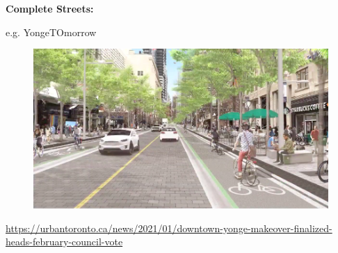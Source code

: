 \documentclass[aspectratio=169]{beamer}
\begin{document}
\begin{frame}
	
	\textbf{Complete Streets:} 
	
	\vspace{2mm}
	
	e.g. YongeTOmorrow 
	
	\vspace{2mm}
	
	\begin{figure}
		\centering
		\includegraphics[width=0.85\linewidth]{images/yongetomorrow.png}
	\end{figure}
	
	\tiny\url{https://urbantoronto.ca/news/2021/01/downtown-yonge-makeover-finalized-heads-february-council-vote}
	
	
\end{frame}
\end{document}

